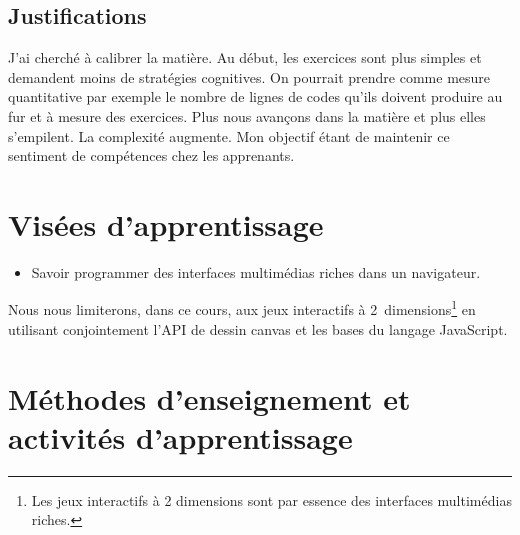\subsection{Justifications}

J'ai cherché à calibrer la matière. Au début, les exercices sont plus simples et demandent moins de stratégies cognitives. On pourrait prendre comme mesure quantitative par exemple le nombre de lignes de codes qu'ils doivent produire au fur et à mesure
des exercices. Plus nous avançons dans la matière et plus elles s’empilent. La complexité augmente. Mon objectif étant de maintenir ce sentiment de compétences\cite{viau1994motivation} chez les apprenants.

\clearpage
\section{Visées d’apprentissage}
\begin{itemize}
    \item Savoir programmer des interfaces multimédias riches dans un navigateur.
\end{itemize}

Nous nous limiterons, dans ce cours, aux jeux interactifs à 2~dimensions\footnote{Les jeux interactifs à 2 dimensions sont par essence des interfaces multimédias riches.} en utilisant conjointement l’API de dessin canvas et les bases du langage JavaScript.

\section{Méthodes d’enseignement et activités d’apprentissage}

